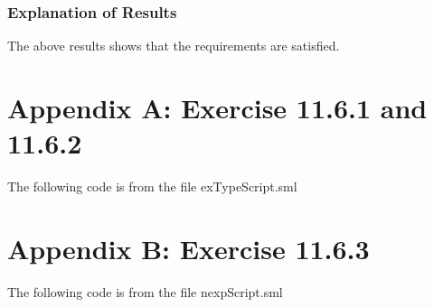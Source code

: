 \documentclass{report}
\begin{document}
\subsection{Explanation of Results}
\label{sec:explanation-results-3}
The above results shows that the requirements are satisfied.


\chapter{Appendix A: Exercise 11.6.1 and 11.6.2}
\label{cha:appendix-a:chapter9}

The following code is from the file exTypeScript.sml


\chapter{Appendix B: Exercise 11.6.3}
\label{cha:appendix-a:chapter10}

The following code is from the file nexpScript.sml

\end{document}
